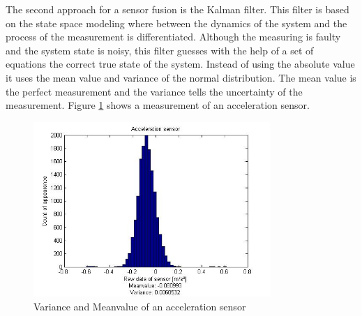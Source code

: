 The second approach for a sensor fusion is the Kalman filter. This filter is based on the state space modeling where between the dynamics of the system and the process of the measurement is differentiated. Although the measuring is faulty and the system state is noisy, this filter guesses with the help of a set of equations the correct true state of the system. Instead of using the absolute value it uses the mean value and variance of the normal distribution. The mean value is the perfect measurement and the variance tells the uncertainty of the measurement. Figure \ref{fig:measurement} shows a measurement of an acceleration sensor.
\begin{figure}[H]
	\centering\includegraphics[width=0.8\textwidth]{fig/Kal_Comp/AccX.jpg}
	\caption{Variance and Meanvalue of an acceleration sensor}
	\label{fig:measurement}
\end{figure}

